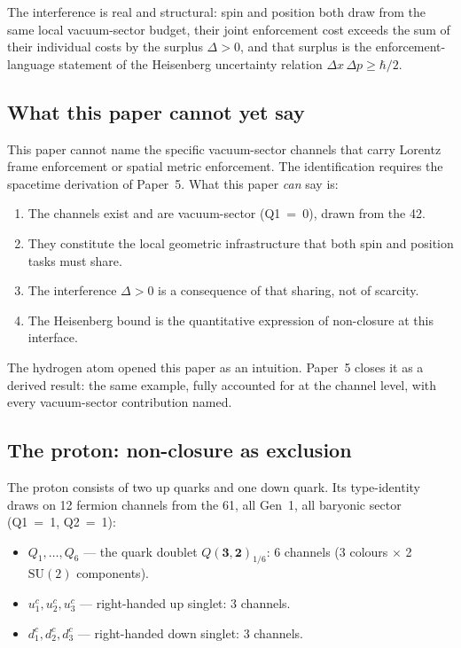\documentclass[11pt]{article}
\newenvironment{varlist}{\begin{itemize}[nosep,leftmargin=2em]}{\end{itemize}}
\newcommand{\SU}{\mathrm{SU}}
\begin{document}
The interference is real and structural: spin and position both draw from
the same local vacuum-sector budget, their joint enforcement cost exceeds
the sum of their individual costs by the surplus $\Delta > 0$, and that
surplus is the enforcement-language statement of the Heisenberg
uncertainty relation $\Delta x\,\Delta p \ge \hbar/2$.

\subsection*{What this paper cannot yet say}

This paper cannot name the specific vacuum-sector channels that carry
Lorentz frame enforcement or spatial metric enforcement.  The
identification requires the spacetime derivation of Paper~5.  What this
paper \emph{can} say is:

\begin{enumerate}
\item The channels exist and are vacuum-sector (Q1~=~0), drawn from the
42.
\item They constitute the local geometric infrastructure that both spin
and position tasks must share.
\item The interference $\Delta > 0$ is a consequence of that sharing,
not of scarcity.
\item The Heisenberg bound is the quantitative expression of
non-closure at this interface.
\end{enumerate}

The hydrogen atom opened this paper as an intuition.  Paper~5 closes it
as a derived result: the same example, fully accounted for at the channel
level, with every vacuum-sector contribution named.

\subsection*{The proton: non-closure as exclusion}

The proton consists of two up quarks and one down quark.  Its
type-identity draws on 12 fermion channels from the 61, all Gen~1, all
baryonic sector (Q1~=~1, Q2~=~1):

\begin{varlist}
\item $Q_1,\ldots,Q_6$ --- the quark doublet $Q(\mathbf{3},\mathbf{2})_{1/6}$: 6 channels
(3 colours $\times$ 2 $\SU(2)$ components).
\item $u^c_1, u^c_2, u^c_3$ --- right-handed up singlet: 3 channels.
\item $d^c_1, d^c_2, d^c_3$ --- right-handed down singlet: 3 channels.
\end{varlist}
\end{document}
